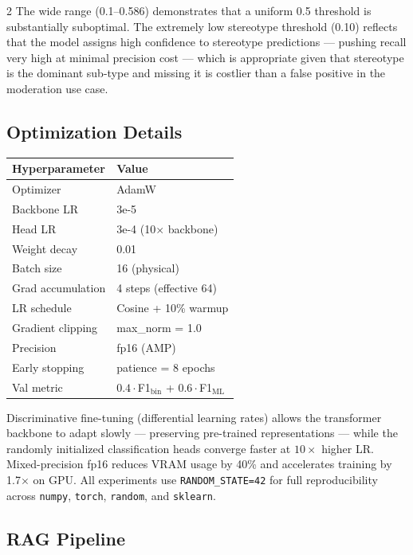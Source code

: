 \documentclass[11pt]{article}
\begin{document}
\begin{multicols}{2}
The wide range (0.1–0.586) demonstrates that a uniform 0.5 threshold is substantially suboptimal. The extremely low stereotype threshold (0.10) reflects that the model assigns high confidence to stereotype predictions — pushing recall very high at minimal precision cost — which is appropriate given that stereotype is the dominant sub-type and missing it is costlier than a false positive in the moderation use case.

\subsection{Optimization Details}

\begin{center}
\small
\begin{tabular}{ll}
\toprule
\textbf{Hyperparameter} & \textbf{Value} \\
\midrule
Optimizer              & AdamW \\
Backbone LR            & 3e-5 \\
Head LR                & 3e-4 (10$\times$ backbone) \\
Weight decay           & 0.01 \\
Batch size             & 16 (physical) \\
Grad accumulation      & 4 steps (effective 64) \\
LR schedule            & Cosine + 10\% warmup \\
Gradient clipping      & max\_norm = 1.0 \\
Precision              & fp16 (AMP) \\
Early stopping         & patience = 8 epochs \\
Val metric             & $0.4\cdot$F1$_\text{bin}$ + $0.6\cdot$F1$_\text{ML}$ \\
\bottomrule
\end{tabular}
\end{center}

Discriminative fine-tuning (differential learning rates) allows the transformer backbone to adapt slowly — preserving pre-trained representations — while the randomly initialized classification heads converge faster at $10\times$ higher LR. Mixed-precision fp16 reduces VRAM usage by 40\% and accelerates training by 1.7$\times$ on GPU. All experiments use \texttt{RANDOM\_STATE=42} for full reproducibility across \texttt{numpy}, \texttt{torch}, \texttt{random}, and \texttt{sklearn}.

\subsection{RAG Pipeline}


\end{multicols}
\end{document}
